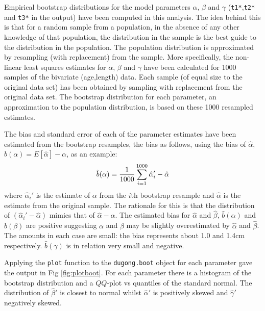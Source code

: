 \documentclass[a4paper,11pt]{article}
\begin{document}
Empirical bootstrap distributions for the model parameters $\alpha$, $\beta$ and
$\gamma$ (\texttt{t1*},\texttt{t2*} and \texttt{t3*} in the output)
have been computed in this analysis. The idea behind this is
that for a random sample from a population, in the absence of any
other knowledge of that population, the distribution in the sample is
the best guide to the distribution in the population. The population
distribution is approximated by resampling (with replacement) from the
sample. More specifically, the non-linear least squares estimates for
$\alpha$, $\beta$ and $\gamma$ have been calculated for 1000 samples
of the bivariate (age,length) data. Each sample (of equal size to the
original data set) has been obtained by sampling with replacement from
the original data set. The bootstrap distribution for each parameter,
an approximation to the population distribution, is based on these
1000 resampled estimates.

The bias and standard error of each of the parameter estimates have been
estimated from the bootstrap resamples, the bias as follows, using the
bias of $\hat\alpha$, $b(\alpha)=E[\hat\alpha]-\alpha$, as an example:
\begin{equation*}
  \hat{b}(\alpha)= \frac{1}{1000}\sum_{i=1}^{1000}\hat\alpha_i' - \hat\alpha  \\
\end{equation*}
where $\hat\alpha_i'$ is the estimate of $\alpha$ from the $i$th bootstrap
resample and $\hat\alpha$ is the estimate from the original
sample. The rationale for this is that the distribution of
$(\hat\alpha_i'-\hat\alpha)$ mimics that of
$\hat\alpha-\alpha$. The estimated bias for $\hat\alpha$ and
$\hat\beta$, $\hat{b}(\alpha)$ and $\hat{b}(\beta)$ are
positive suggesting $\alpha$ and $\beta$ may be slightly overestimated
by $\hat\alpha$ and $\hat\beta$. The amounts in each case are small:
the bias represents about 1.0 and 1.4cm
respectively. $\hat{b}(\gamma)$ is in relation very small and negative.

Applying the \texttt{plot} function to the \texttt{dugong.boot} object
for each parameter gave the output in Fig \ref{fig:plotboot}. For each
parameter there is a histogram of the bootstrap distribution and a
$QQ$-plot vs quantiles of the standard normal. The distribution of
$\hat\beta'$ is closest to normal whilst $\hat\alpha'$
is positively skewed and $\hat\gamma'$ negatively skewed.
\end{document}
